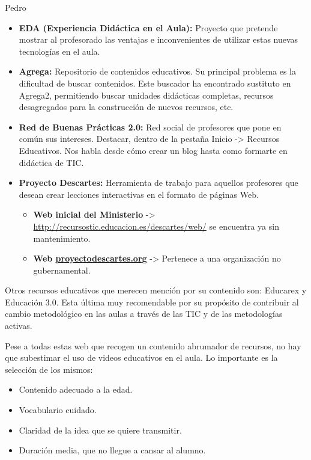 \begin{opin}{\pedrocolor}{Pedro}
\begin{leftbar}{\pedrocolor}
\begin{itemize}
\item \textbf{EDA (Experiencia Didáctica en el Aula):} Proyecto que pretende mostrar al profesorado las ventajas e inconvenientes de utilizar estas nuevas tecnologías en el aula. 

\item \textbf{Agrega:} Repositorio de contenidos educativos. Su principal problema es la dificultad de buscar contenidos. Este buscador ha encontrado sustituto en Agrega2, permitiendo buscar unidades didácticas completas, recursos desagregados para la construcción de nuevos recursos, etc. 

\item \textbf{Red de Buenas Prácticas 2.0:} Red social de profesores que pone en común sus intereses. Destacar, dentro de la pestaña Inicio -> Recursos Educativos. Nos habla desde cómo crear un blog hasta como formarte en didáctica de TIC. 

\item \textbf{Proyecto Descartes:} Herramienta de trabajo para aquellos profesores que desean crear lecciones interactivas en el formato de páginas Web. 

\begin{itemize}

\item \textbf{Web inicial del Ministerio} -> \url{http://recursostic.educacion.es/descartes/web/} se encuentra ya sin mantenimiento. 

\item \textbf{Web \url{proyectodescartes.org}} -> Pertenece a una organización no gubernamental. 
\end{itemize}
\end{itemize}
 
Otros recursos educativos que merecen mención por su contenido son: Educarex y Educación 3.0. Esta última muy recomendable por su propósito de contribuir al cambio metodológico en las aulas a través de las TIC y de las metodologías activas.

Pese a todas estas web que recogen un contenido abrumador de recursos, no hay que subestimar el uso de videos educativos en el aula. Lo importante es la selección de los mismos:

\begin{itemize}

\item Contenido adecuado a la edad. 
\item Vocabulario cuidado. 
\item Claridad de la idea que se quiere transmitir. 
\item Duración media, que no llegue a cansar al alumno. 
 

\end{itemize}
\end{leftbar}
\end{opin}
